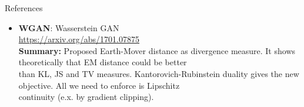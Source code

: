 \documentclass{beamer}
\begin{document}
\begin{frame}{References}
{\begin{itemize}
	\item \textbf{WGAN}: Wasserstein GAN \\
	\href{https://arxiv.org/abs/1701.07875}{https://arxiv.org/abs/1701.07875} \\
	\textbf{Summary:} Proposed Earth-Mover distance as divergence measure. It shows theoretically that EM distance could be better \\ than KL, JS and TV measures. Kantorovich-Rubinstein duality gives the new objective. All we need to enforce is Lipschitz \\ continuity (e.x. by gradient clipping).
\end{itemize}
}
\end{frame}
\end{document}
